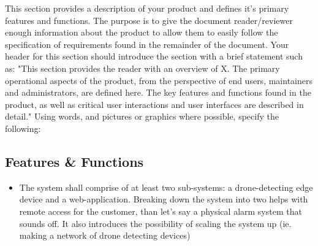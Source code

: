 This section provides a description of your product and defines it's primary features and functions. The purpose is to give the document reader/reviewer enough information about the product to allow them to easily follow the specification of requirements found in the remainder of the document. Your header for this section should introduce the section with a brief statement such as: "This section provides the reader with an overview of X. The primary operational aspects of the product, from the perspective of end users, maintainers and administrators, are defined here. The key features and functions found in the product, as well as critical user interactions and user interfaces are described in detail." Using words, and pictures or graphics where possible, specify the following:

\subsection{Features \& Functions}
\begin{itemize}
    \item The system shall comprise of at least two sub-systems: a drone-detecting edge device and a web-application.
    Breaking down the system into two helps with remote access for the customer, than let's say a physical alarm system that sounds off. It also introduces the possibility of scaling the system up (ie. making a network of drone detecting devices)

\end{itemize}

